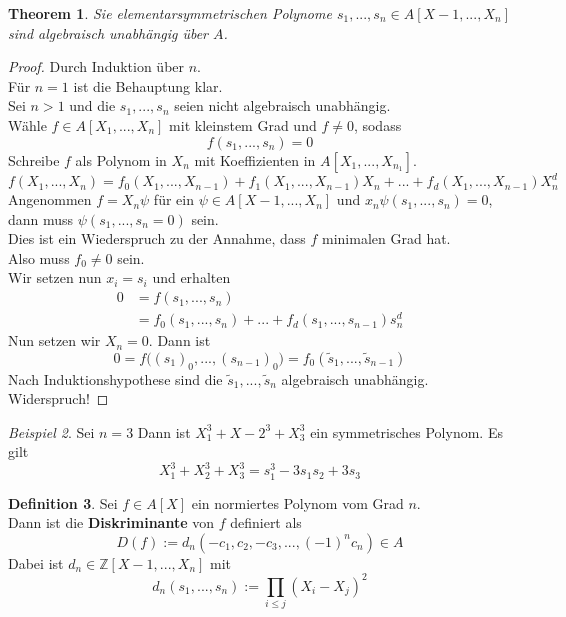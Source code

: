 \documentclass[10pt,a4paper]{article}
\newcommand{\Z}{\ensuremath{\mathbb{Z}}}
\theoremstyle{plain}
\newtheorem{theorem}{Theorem}[section]
\theoremstyle{definition}
\newtheorem{definition}[theorem]{Definition}
\theoremstyle{remark}
\newtheorem{exm}[theorem]{Beispiel}
\begin{document}
	\begin{theorem}
		Sie elementarsymmetrischen Polynome $s_1,...,s_n\in A[X-1,...,X_n]$ sind algebraisch unabhängig über $A$.
	\end{theorem}
	\begin{proof}
		Durch Induktion über $n$.\\
		Für $n=1$ ist die Behauptung klar.\\
		Sei $n>1$ und die $s_1,...,s_n$ seien nicht algebraisch unabhängig.\\
		Wähle $f\in A[X_1,...,X_n]$ mit kleinstem Grad und $f\neq 0$, sodass
		\[f(s_1,...,s_n)=0\]
		Schreibe $f$ als Polynom in $X_n$ mit Koeffizienten in $A[X_1,...,X_{n_1}]$.\\
		\[f(X_1,...,X_n)=f_0(X_1,...,X_{n-1})+f_1(X_1,...,X_{n-1})X_n+...+f_d(X_1,...,X_{n-1})X_n^d\]
		Angenommen $f=X_n\psi$ für ein $\psi\in A[X-1,...,X_n]$ und $x_n\psi(s_1,...,s_n)=0$, dann muss $\psi(s_1,...,s_n=0)$ sein.\\
		Dies ist ein Wiederspruch zu der Annahme, dass $f$ minimalen Grad hat.\\
		Also muss $f_0\neq 0$ sein.\\
		Wir setzen nun $x_i=s_i$ und erhalten
		\begin{align*}
		0&=f(s_1,...,s_n)\\
		&=f_0(s_1,...,s_n)+...+f_d(s_1,...,s_{n-1})s_n^d
		\end{align*}
		Nun setzen wir $X_n=0$. Dann ist 
		\[0=f\big((s_1)_0,...,(s_{n-1})_0\big)=f_0(\tilde s_1,...,\tilde s_{n-1})\]
		Nach Induktionshypothese sind die $\tilde s_1,...,\tilde s_n$ algebraisch unabhängig. Widerspruch!
	\end{proof}

	
	\begin{exm}
		Sei $n=3$ Dann ist $X_1^3+X-2^3+X_3^3$ ein symmetrisches Polynom. Es gilt \[X_1^3+X_2^3+X_3^3=s_1^3-3s_1s_2+3s_3\]
	\end{exm}


	\begin{definition}
		Sei $f\in A[X]$ ein normiertes Polynom vom Grad $n$.\\
		Dann ist die \textbf{Diskriminante}  von $f$ definiert als
		\[D(f):=d_n(-c_1,c_2,-c_3,...,(-1)^nc_n)\in A\]
		Dabei ist $d_n\in\Z[X-1,...,X_n]$ mit
		\[d_n(s_1,...,s_n):=\prod_{i\leq j}(X_i-X_j)^2\]
	\end{definition}
\end{document}
